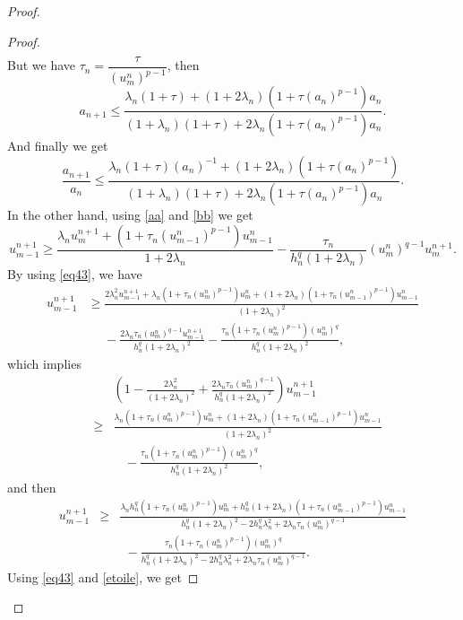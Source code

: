 \documentclass[a4paper,12pt,english,reqno]{smfart}
\begin{document}
\begin{proof}
\begin{proof}
\begin{eqnarray*}
			\end{eqnarray*}	
			But we have $\tau_{n}=\dfrac{\tau}{(u_{m}^{n})^{p-1}}$, then
			\begin{equation}
			a_{n+1}\leq \frac{\lambda_{n}(1+\tau)+(1+2\lambda_{n})(1+\tau(a_{n})^{p-1})a_{n}}{(1+\lambda_{n})(1+\tau)+2\lambda_{n}(1+\tau(a_{n})^{p-1})a_{n}}.
			\label{eq412}
			\end{equation}
			And finally we get 
			\begin{equation}
			\frac{a_{n+1}}{a_{n}}\leq
			\frac{\lambda_{n}(1+\tau)(a_{n})^{-1}+(1+2\lambda_{n})(1+\tau(a_{n})^{p-1})}{(1+\lambda_{n})(1+\tau)+2\lambda_{n}(1+\tau(a_{n})^{p-1})a_{n}}. 
			\label{eq413}
			\end{equation}
			In the other hand, using \eqref{aa} and \eqref{bb} we get
			\begin{equation*}
			u_{m-1}^{n+1} \geq
			\frac{\lambda_{n}u_{m}^{n+1}+(1+\tau_{n}(u_{m-1}^{n})^{p-1})u_{m-1}^{n}}{1+2\lambda_{n}}-\frac{\tau_{n}}{h_{n}^{q}(1+2\lambda_{n})}(u_{m}^{n})^{q-1}u_{m}^{n+1}.
			\end{equation*}
			By using \eqref{eq43}, we have
			\begin{align*}
			u_{m-1}^{n+1}
			& \geq
			\frac{2\lambda_{n}^{2}u_{m-1}^{n+1}+\lambda_{n}(1+\tau_{n}(u_{m}^{n})^{p-1})u_{m}^{n}+(1+2\lambda_{n})(1+\tau_{n}(u_{m-1}^{n})^{p-1})u_{m-1}^{n}}{(1+2\lambda_{n})^{2}}\\
			&\ \ \ \ \ \  -\frac{2\lambda_{n}\tau_{n}(u_{m}^{n})^{q-1}u_{m-1}^{n+1}}{h_{n}^{q}(1+2\lambda_{n})^{2}}-\frac{\tau_{n}(1+\tau_{n}(u_{m}^{n})^{p-1})(u_{m}^{n})^{q}}{h_{n}^{q}(1+2\lambda_{n})^{2}},
			\end{align*}
			which implies
			\begin{eqnarray*}
				&&\left(1-\frac{2\lambda_{n}^{2}}{(1+2\lambda_{n})^{2}}+\frac{2\lambda_{n}\tau_{n}(u_{m}^{n})^{q-1}}{h_{n}^{q}(1+2\lambda_{n})^{2}}\right)u_{m-1}^{n+1}\\
				&\geq& \frac{\lambda_{n}(1+\tau_{n}(u_{m}^{n})^{p-1})u_{m}^{n}+(1+2\lambda_{n})(1+\tau_{n}(u_{m-1}^{n})^{p-1})u_{m-1}^{n}}{(1+2\lambda_{n})^{2}}\\ &&\ \ \ \ -\frac{\tau_{n}(1+\tau_{n}(u_{m}^{n})^{p-1})(u_{m}^{n})^{q}}{h_{n}^{q}(1+2\lambda_{n})^{2}},
			\end{eqnarray*}
			and then
			\begin{eqnarray}
			u_{m-1}^{n+1}
			\nonumber &\geq&
			\frac{\lambda_{n}h_{n}^{q}(1+\tau_{n}(u_{m}^{n})^{p-1})u_{m}^{n}+h_{n}^{q}(1+2\lambda_{n})(1+\tau_{n}(u_{m-1}^{n})^{p-1})u_{m-1}^{n}}{h_{n}^{q}(1+2\lambda_{n})^{2}-2h_{n}^{q}\lambda_{n}^{2}+2\lambda_{n}\tau_{n}(u_{m}^{n})^{q-1}}\\
			&& \ \ -\frac{\tau_{n}(1+\tau_{n}(u_{m}^{n})^{p-1})(u_{m}^{n})^{q}}{{h_{n}^{q}(1+2\lambda_{n})^{2}-2h_{n}^{q}\lambda_{n}^{2}+2\lambda_{n}\tau_{n}(u_{m}^{n})^{q-1}}}.
			\label{etoile}
			\end{eqnarray}
			Using \eqref{eq43} and \eqref{etoile}, we get
		

\end{proof}
\end{proof}
\end{document}
